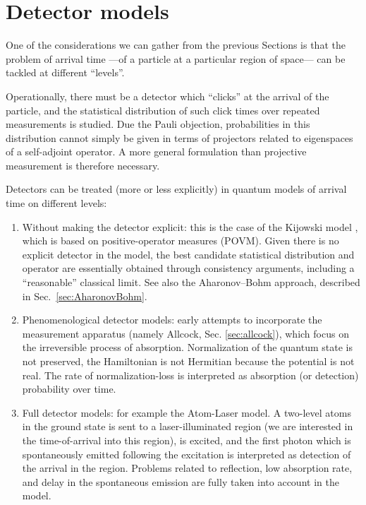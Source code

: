 \section{Detector models}\label{sec:hist:detect}

One of the considerations we can gather from the previous Sections
is that
the problem of arrival time ---of a particle at a particular region of space---
can be tackled at different ``levels''.

Operationally, there must be a detector which
``clicks'' at the arrival of the particle, and the statistical distribution of
such click times over repeated measurements is studied. Due the Pauli objection,
probabilities in this distribution cannot simply be given in terms of projectors related to eigenspaces of a self-adjoint operator.
A more general formulation than projective measurement is therefore necessary.

Detectors can be treated (more or less explicitly) in quantum models of arrival time on different levels:
\begin{enumerate}
  \item
    Without making the detector explicit: this is the case of the Kijowski model \parencite{Kijowski, Leavens_TOA},
    which is based on positive-operator measures (POVM). Given there is no explicit detector in the model,
    the best candidate statistical distribution and operator are essentially obtained
    through consistency arguments, including a ``reasonable'' classical limit.
    See also the Aharonov--Bohm approach, described in Sec.~\ref{sec:AharonovBohm}.
  \item
    Phenomenological detector models:
    early attempts to incorporate the measurement apparatus
    (namely Allcock, Sec. \ref{sec:allcock}), which
    focus on the irreversible process of absorption.
    Normalization of the quantum state is not preserved, the Hamiltonian is not Hermitian
    because the potential is not real. The rate of normalization-loss is interpreted as
    absorption (or detection) probability over time.
  \item
    Full detector models: for example the Atom-Laser model. A two-level atoms in the ground state
    is sent to a laser-illuminated region (we are interested in the time-of-arrival into this region),
    is excited, and the first photon which is spontaneously emitted following the excitation
    is interpreted as detection of the arrival in the region. Problems related to
    reflection, low absorption rate, and delay in the spontaneous emission are fully taken into account in the model.
\end{enumerate}

